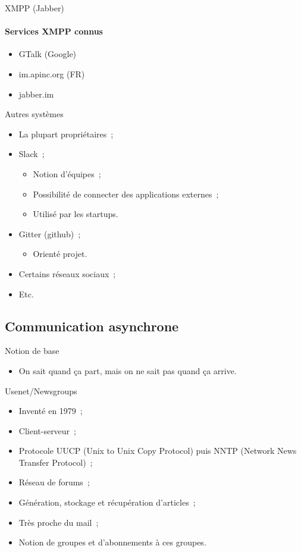 \begin{frame}{XMPP (Jabber)}
\framesubtitle{Services XMPP connus}
\begin{itemize}
 \item GTalk (Google)
 \pause
 \item im.apinc.org (FR)
 \pause
 \item jabber.im
\end{itemize}

\end{frame}

\begin{frame}{Autres systèmes}
\begin{itemize}
 \item La plupart propriétaires~;
 \pause
 \item Slack~;
 \begin{itemize}
  \item Notion d'équipes~;
  \pause
  \item Possibilité de connecter des applications externes~;
  \pause
  \item Utilisé par les startups.
 \end{itemize}
 \pause
 \item Gitter (github)~;
 \begin{itemize}
  \item Orienté projet.
 \end{itemize}
 \pause
 \item Certains réseaux sociaux~;
 \pause
 \item Etc.
\end{itemize}
\end{frame}

\subsection{Communication asynchrone}

\begin{frame}{Notion de base}
 \begin{itemize}
  \item On sait quand ça part, mais on ne sait pas quand ça arrive.
 \end{itemize}
\end{frame}

\begin{frame}{Usenet/Newsgroups}
\begin{itemize}
 \item Inventé en 1979~;
 \pause
 \item Client-serveur~;
 \pause
 \item Protocole UUCP (Unix to Unix Copy Protocol) puis NNTP (Network News Transfer Protocol)~;
 \pause
 \item Réseau de forums~;
 \pause
 \item Génération, stockage et récupération d'articles~;
 \pause
 \item Très proche du mail~;
 \pause
 \item Notion de groupes et d'abonnements à ces groupes.
\end{itemize}
\end{frame}

